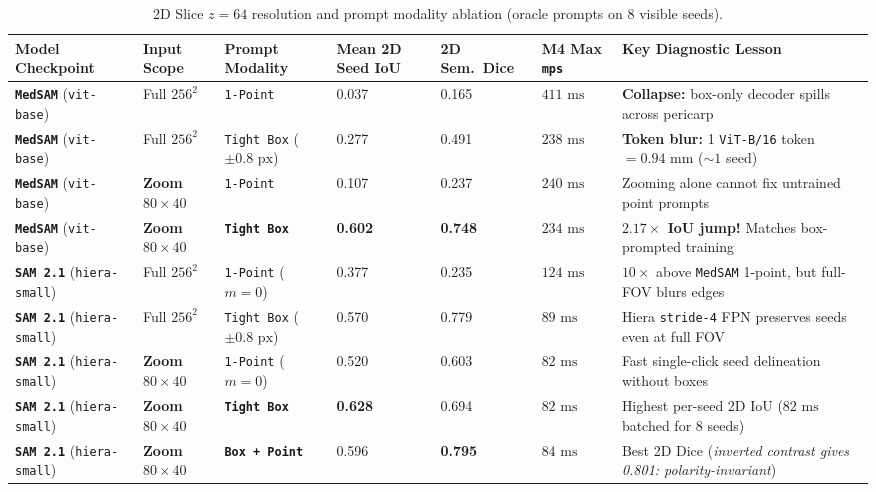 \documentclass[10.5pt,a4paper]{article}
\begin{document}
\begin{table}[ht!]
\centering
\scriptsize
\renewcommand{\arraystretch}{1.18}
\begin{tabularx}{\textwidth}{L{2.7cm} L{1.75cm} L{2.15cm} C{1.45cm} C{1.45cm} R{1.35cm} Y}
\toprule
{}
\textbf{Model Checkpoint} & \textbf{Input Scope} & \textbf{Prompt Modality} & \textbf{Mean 2D Seed IoU} & \textbf{2D Sem.\ Dice} & \textbf{M4 Max \texttt{mps}} & \textbf{Key Diagnostic Lesson} \\
\midrule
\textbf{\texttt{MedSAM}} (\texttt{vit-base}) & Full $256^2$ & \texttt{1-Point} & 0.037 & 0.165 & $411\text{ ms}$ & \textbf{Collapse:} box-only decoder spills across pericarp \\
\textbf{\texttt{MedSAM}} (\texttt{vit-base}) & Full $256^2$ & \texttt{Tight Box} ($\pm 0.8\text{ px}$) & 0.277 & 0.491 & $238\text{ ms}$ & \textbf{Token blur:} 1 \texttt{ViT-B/16} token $= 0.94\text{ mm}$ ($\sim 1$ seed) \\
\textbf{\texttt{MedSAM}} (\texttt{vit-base}) & \textbf{Zoom $80\times 40$} & \texttt{1-Point} & 0.107 & 0.237 & $240\text{ ms}$ & Zooming alone cannot fix untrained point prompts \\
\textbf{\texttt{MedSAM}} (\texttt{vit-base}) & \textbf{Zoom $80\times 40$} & \textbf{\texttt{Tight Box}} & \textbf{0.602} & \textbf{0.748} & $234\text{ ms}$ & \textbf{$2.17\times$ IoU jump!} Matches box-prompted training \\
\textbf{\texttt{SAM 2.1}} (\texttt{hiera-small}) & Full $256^2$ & \texttt{1-Point} ($m=0$) & 0.377 & 0.235 & $124\text{ ms}$ & $10\times$ above \texttt{MedSAM} 1-point, but full-FOV blurs edges \\
\textbf{\texttt{SAM 2.1}} (\texttt{hiera-small}) & Full $256^2$ & \texttt{Tight Box} ($\pm 0.8\text{ px}$) & 0.570 & 0.779 & $89\text{ ms}$ & Hiera \texttt{stride-4} FPN preserves seeds even at full FOV \\
\textbf{\texttt{SAM 2.1}} (\texttt{hiera-small}) & \textbf{Zoom $80\times 40$} & \texttt{1-Point} ($m=0$) & 0.520 & 0.603 & \textbf{$82\text{ ms}$} & Fast single-click seed delineation without boxes \\
\textbf{\texttt{SAM 2.1}} (\texttt{hiera-small}) & \textbf{Zoom $80\times 40$} & \textbf{\texttt{Tight Box}} & \textbf{0.628} & 0.694 & \textbf{$82\text{ ms}$} & Highest per-seed 2D IoU ($82\text{ ms}$ batched for 8 seeds) \\
\textbf{\texttt{SAM 2.1}} (\texttt{hiera-small}) & \textbf{Zoom $80\times 40$} & \textbf{\texttt{Box + Point}} & 0.596 & \textbf{0.795} & \textbf{$84\text{ ms}$} & Best 2D Dice (\emph{inverted contrast gives 0.801: polarity-invariant}) \\
\bottomrule
\end{tabularx}
\caption{2D Slice $z = 64$ resolution and prompt modality ablation (oracle prompts on 8 visible seeds).}
\end{table}
\end{document}
